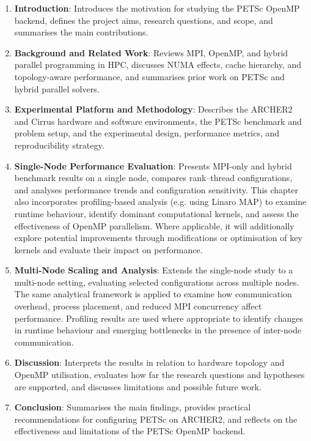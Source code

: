 \documentclass{article}
\begin{document}
\begin{enumerate}

    \item \textbf{Introduction}: 
    Introduces the motivation for studying the PETSc OpenMP backend, defines the project aims, research questions, and scope, and summarises the main contributions.

    \item \textbf{Background and Related Work}: 
    Reviews MPI, OpenMP, and hybrid parallel programming in HPC, discusses NUMA effects, cache hierarchy, and topology-aware performance, and summarises prior work on PETSc and hybrid parallel solvers.

    \item \textbf{Experimental Platform and Methodology}: 
    Describes the ARCHER2 and Cirrus hardware and software environments, the PETSc benchmark and problem setup, and the experimental design, performance metrics, and reproducibility strategy.

    \item \textbf{Single-Node Performance Evaluation}: 
    Presents MPI-only and hybrid benchmark results on a single node, compares rank--thread configurations, and analyses performance trends and configuration sensitivity. 
    This chapter also incorporates profiling-based analysis (e.g. using Linaro MAP) to examine runtime behaviour, identify dominant computational kernels, and assess the effectiveness of OpenMP parallelism. 
    Where applicable, it will additionally explore potential improvements through modifications or optimisation of key kernels and evaluate their impact on performance.

    \item \textbf{Multi-Node Scaling and Analysis}: 
    Extends the single-node study to a multi-node setting, evaluating selected configurations across multiple nodes. 
    The same analytical framework is applied to examine how communication overhead, process placement, and reduced MPI concurrency affect performance. 
    Profiling results are used where appropriate to identify changes in runtime behaviour and emerging bottlenecks in the presence of inter-node communication.

    \item \textbf{Discussion}: 
    Interprets the results in relation to hardware topology and OpenMP utilisation, evaluates how far the research questions and hypotheses are supported, and discusses limitations and possible future work.

    \item \textbf{Conclusion}: 
    Summarises the main findings, provides practical recommendations for configuring PETSc on ARCHER2, and reflects on the effectiveness and limitations of the PETSc OpenMP backend.

\end{enumerate}

\pagebreak
\printbibliography
\end{document}
